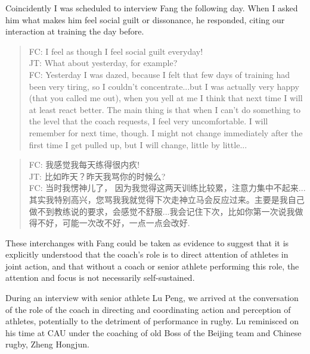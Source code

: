 \begin{CJK}{UTF8}{gbsn}
Coincidently I was scheduled to interview Fang the following day. When I asked him what makes him feel social guilt or dissonance, he responded, citing our interaction at training the day before.

    \begin{quotation}
      FC: I feel as though I feel social guilt everyday! \\
      JT: What about yesterday, for example? \\
      FC: Yesterday I was dazed, because I felt that few days of training had been very tiring, so I couldn't concentrate...but I was actually very happy (that you called me out), when you yell at me I think that next time I will at least react better.  The main thing is that when I can't do something to the level that the coach requests, I feel very uncomfortable.  I will remember for next time, though.  I might not change immediately after the first time I get pulled up, but I will change, little by little... \\
    \end{quotation}

    \begin{quotation}
      FC: 我感觉我每天练得很内疚! \\
      JT: 比如昨天？昨天我骂你的时候么? \\
      FC: 当时我愣神儿了， 因为我觉得这两天训练比较累，注意力集中不起来...其实我特别高兴，您骂我我就觉得下次走神立马会反应过来。主要是我自己做不到教练说的要求，会感觉不舒服...我会记住下次，比如你第一次说我做得不好，可能一次改不好，一点一点会改好.
    \end{quotation}



These interchanges with Fang could be taken as evidence to suggest that it is explicitly understood that the coach's role is to direct attention of athletes in joint action, and that without a coach or senior athlete performing this role, the attention and focus is not necessarily self-sustained.

During an interview with senior athlete Lu Peng, we arrived at the conversation of the role of the coach in directing and coordinating action and perception of athletes, potentially to the detriment of performance in rugby. Lu reminisced on his time at CAU under the coaching of old Boss of the Beijing team and Chinese rugby, Zheng Hongjun.


\end{CJK}
